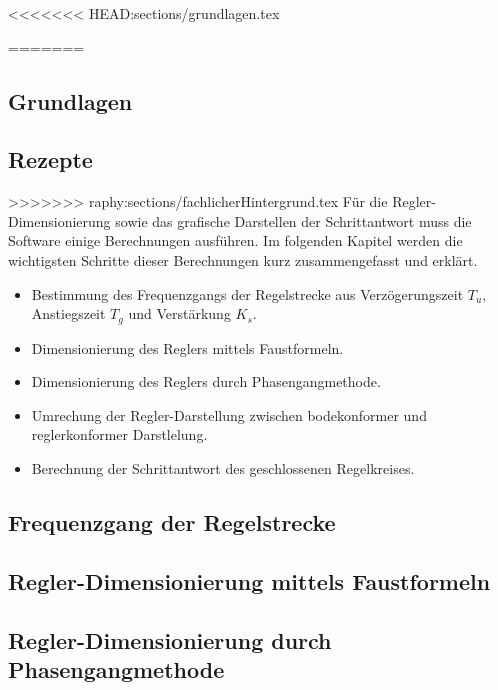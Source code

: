 <<<<<<< HEAD:sections/grundlagen.tex

=======
\subsection{Grundlagen}


\subsection{Rezepte}
>>>>>>> raphy:sections/fachlicherHintergrund.tex
F\"ur   die  Regler-Dimensionierung   sowie  das   grafische  Darstellen   der
Schrittantwort  muss   die  Software  einige  Berechnungen   ausf\"uhren.   Im
folgenden  Kapitel werden  die wichtigsten  Schritte dieser  Berechnungen kurz
zusammengefasst und erkl\"art.

\begin{itemize}
    \item
    Bestimmung  des  Frequenzgangs  der  Regelstrecke  aus  Verz\"ogerungszeit
    $T_u$, Anstiegszeit $T_g$ und Verst\"arkung $K_s$.
    \item
    Dimensionierung des Reglers mittels Faustformeln.
    \item
    Dimensionierung des Reglers durch Phasengangmethode.
    \item
    Umrechung der Regler-Darstellung zwischen bodekonformer und reglerkonformer
    Darstlelung. 
    \item
    Berechnung der Schrittantwort des geschlossenen Regelkreises.
\end{itemize}

\subsection{Frequenzgang der Regelstrecke}


\subsection{Regler-Dimensionierung mittels Faustformeln}


\subsection{Regler-Dimensionierung durch Phasengangmethode}


